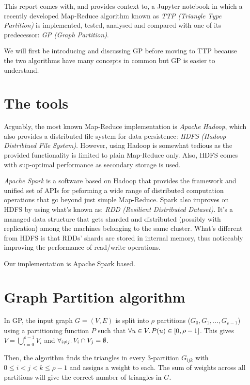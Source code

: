 \documentclass[paper=a4, fontsize=11pt]{scrartcl}
\numberwithin{equation}{section}
\numberwithin{figure}{section}
\numberwithin{table}{section}
\begin{document}
This report comes with, and provides context to, a Jupyter notebook in which a
recently developed Map-Reduce algorithm known as \emph{TTP (Triangle Type
Partition)} is implemented, tested, analysed and compared with one of its
predecessor: \emph{GP (Graph Partition)}.

We will first be introducing and discussing GP before moving to TTP because the
two algorithms have many concepts in common but GP is easier to understand.

\section{The tools}
Arguably, the most known Map-Reduce implementation is \emph{Apache Hadoop},
which also provides a distributed file system for data persistence: \emph{HDFS
(Hadoop Distribtued File System)}. However, using Hadoop is somewhat tedious as
the provided functionality is limited to plain Map-Reduce only. Also, HDFS comes
with sup-optimal performance as secondary storage is used.

\emph{Apache Spark} is a software based on Hadoop that provides the framework
and unified set of APIs for peforming a wide range of distributed computation
operations that go beyond just simple Map-Reduce. Spark also improves on HDFS by
using what's known as: \emph{RDD (Resilient Distributed Dataset)}. It's a
managed data structure that gets sharded and distributed (possibly with
replication) among the machines belonging to the same cluster. What's different
from HDFS is that RDDs' shards are stored in internal memory, thus noticeably
improving the performance of read/write operations.

Our implementation is Apache Spark based.

\section{Graph Partition algorithm}
In GP, the input graph $G=(V, E)$ is split into $\rho$ partitions ($G_0, G_1,
\dots, G_{\rho-1}$) using a partitioning function $P$ such that $\forall u \in V
\ldotp P(u) \in [0, \rho-1]$. This gives $V=\bigcup_{i=0}^{\rho-1} V_i$
and $\forall_{i\neq j} \ldotp V_i \cap V_j = \emptyset$.

Then, the algorithm finds the triangles in every 3-partition $G_{ijk}$ with $0
\le i < j < k \le \rho - 1$ and assigns a weight to each. The sum of weights
across all partitions will give the correct number of triangles in $G$.
\end{document}
